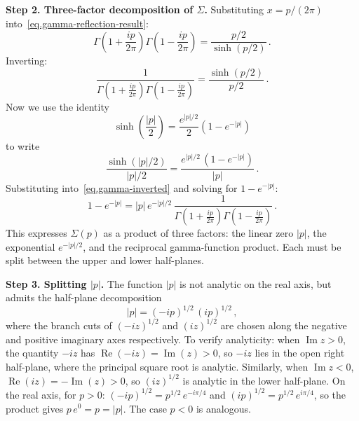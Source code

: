 \documentclass[11pt,a4paper]{article}
\theoremstyle{definition}
\begin{document}
\medskip
\noindent\textbf{Step 2.  Three-factor decomposition of $\Sigma$.}
Substituting $x = p/(2\pi)$ into~\eqref{eq.gamma-reflection-result}:
\begin{equation}\label{eq.gamma-sub}
  \Gamma \left(1 + \frac{ip}{2\pi}\right)
  \Gamma \left(1 - \frac{ip}{2\pi}\right)
  = \frac{p/2}{\sinh(p/2)}\,.
\end{equation}
Inverting:
\begin{equation}\label{eq.gamma-inverted}
  \frac{1}{\Gamma \left(1 + \frac{ip}{2\pi}\right)
  \Gamma \left(1 - \frac{ip}{2\pi}\right)}
  = \frac{\sinh(p/2)}{p/2}\,.
\end{equation}
Now we use the identity
\begin{equation}\label{eq.sinh-identity}
  \sinh \left(\frac{|p|}{2}\right)
  = \frac{e^{|p|/2}}{2}\left(1 - e^{-|p|}\right)
\end{equation}
to write
\begin{equation}
  \frac{\sinh(|p|/2)}{|p|/2}
  = \frac{e^{|p|/2}\,(1 - e^{-|p|})}{|p|}\,.
\end{equation}
Substituting into~\eqref{eq.gamma-inverted} and solving for $1 - e^{-|p|}$:
\begin{equation}\label{eq.symbol_gamma_product}
  1 - e^{-|p|}
  = |p|\,e^{-|p|/2}\,
  \frac{1}{\Gamma \left(1 + \frac{ip}{2\pi}\right)
  \Gamma \left(1 - \frac{ip}{2\pi}\right)}\,.
\end{equation}
This expresses $\Sigma(p)$ as a product of three factors: the linear zero
$|p|$, the exponential $e^{-|p|/2}$, and the reciprocal gamma-function product.
Each must be split between the upper and lower half-planes.

\medskip
\noindent\textbf{Step 3.  Splitting $|p|$.}
The function $|p|$ is not analytic on the real axis, but admits the
half-plane decomposition
\begin{equation}\label{eq.abs-split}
  |p| = (-ip)^{1/2}\,(ip)^{1/2}\,,
\end{equation}
where the branch cuts of $(-iz)^{1/2}$ and $(iz)^{1/2}$ are chosen along the
negative and positive imaginary axes respectively.  To verify
analyticity: when $\operatorname{Im} z > 0$, the quantity $-iz$ has
$\operatorname{Re}(-iz) = \operatorname{Im}(z) > 0$, so $-iz$ lies in the
open right half-plane, where the principal square root is analytic.
Similarly, when $\operatorname{Im} z < 0$,
$\operatorname{Re}(iz) = -\operatorname{Im}(z) > 0$, so $(iz)^{1/2}$ is
analytic in the lower half-plane.  On the real axis, for $p > 0$:
$(-ip)^{1/2} = p^{1/2}\,e^{-i\pi/4}$ and $(ip)^{1/2} = p^{1/2}\,e^{i\pi/4}$,
so the product gives $p\,e^0 = p = |p|$.  The case $p < 0$ is analogous.
\end{document}
